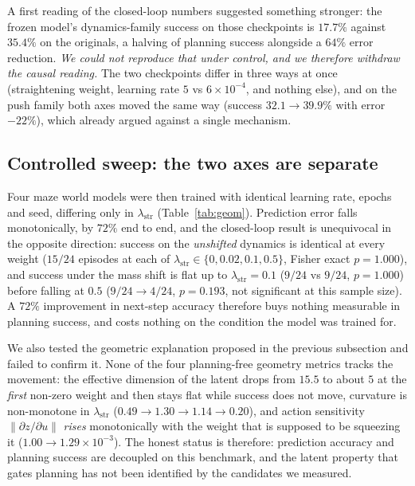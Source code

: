 A first reading of the closed-loop numbers suggested something stronger: the frozen model's
dynamics-family success on those checkpoints is $17.7\%$ against $35.4\%$ on the originals, a
halving of planning success alongside a $64\%$ error reduction. \emph{We could not reproduce that
under control, and we therefore withdraw the causal reading.} The two checkpoints differ in three
ways at once (straightening weight, learning rate $5$ vs $6\times10^{-4}$, and nothing else), and on
the push family both axes moved the same way (success $32.1\to39.9\%$ with error $-22\%$), which
already argued against a single mechanism.

\subsection{Controlled sweep: the two axes are separate}

Four maze world models were then trained with identical learning rate, epochs and seed, differing
only in $\lambda_{\mathrm{str}}$ (Table~\ref{tab:geom}). Prediction error falls monotonically, by
$72\%$ end to end, and the closed-loop result is unequivocal in the opposite direction: success on
the \emph{unshifted} dynamics is identical at every weight ($15/24$ episodes at each of
$\lambda_{\mathrm{str}}\in\{0,0.02,0.1,0.5\}$, Fisher exact $p=1.000$), and success under the mass
shift is flat up to $\lambda_{\mathrm{str}}=0.1$ ($9/24$ vs $9/24$, $p=1.000$) before falling at
$0.5$ ($9/24\to4/24$, $p=0.193$, not significant at this sample size). A $72\%$ improvement in
next-step accuracy therefore buys nothing measurable in planning success, and costs nothing on the
condition the model was trained for.

We also tested the geometric explanation proposed in the previous subsection and failed to confirm
it. None of the four planning-free geometry metrics tracks the movement: the effective dimension of
the latent drops from $15.5$ to about $5$ at the \emph{first} non-zero weight and then stays flat
while success does not move, curvature is non-monotone in $\lambda_{\mathrm{str}}$
($0.49\to1.30\to1.14\to0.20$), and action sensitivity $\|\partial z/\partial u\|$ \emph{rises}
monotonically with the weight that is supposed to be squeezing it
($1.00\to1.29\times10^{-3}$). The honest status is therefore: prediction accuracy and planning
success are decoupled on this benchmark, and the latent property that gates planning has not been
identified by the candidates we measured.



